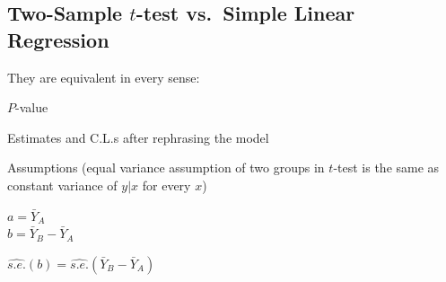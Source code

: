 \subsection{Two-Sample $t$-test vs.\ Simple Linear Regression}
\bi
\item They are equivalent in every sense:
  \bi
  \item $P$-value
  \item Estimates and C.L.s after rephrasing the model
  \item Assumptions (equal variance assumption of two groups in
    $t$-test is the same as constant variance of $y | x$ for every
    $x$)
  \ei
\item $a = \bar{Y}_{A}$ \\
  $b = \bar{Y}_{B} - \bar{Y}_{A}$
\item $\widehat{s.e.}(b) = \widehat{s.e.}(\bar{Y}_{B} - \bar{Y}_{A})$
\ei

